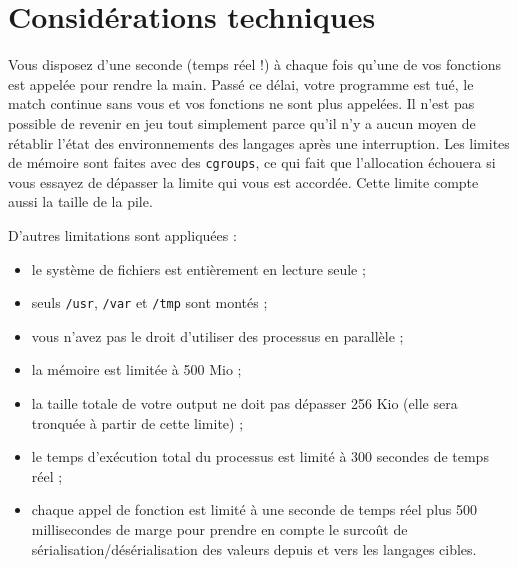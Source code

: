 \section{Considérations techniques}

Vous disposez d'une seconde (temps réel !) à chaque fois qu'une de vos
fonctions est appelée pour rendre la main. Passé ce délai, votre programme est
tué, le match continue sans vous et vos fonctions ne sont plus appelées. Il
n'est pas possible de revenir en jeu tout simplement parce qu'il n'y a aucun
moyen de rétablir l'état des environnements des langages après une
interruption.  Les limites de mémoire sont faites avec des \texttt{cgroups}, ce
qui fait que l'allocation échouera si vous essayez de dépasser la limite qui
vous est accordée. Cette limite compte aussi la taille de la pile.

D'autres limitations sont appliquées :

\begin{itemize}
    \item le système de fichiers est entièrement en lecture seule ;
    \item seuls \texttt{/usr}, \texttt{/var} et \texttt{/tmp} sont montés ;
    \item vous n'avez pas le droit d'utiliser des processus en parallèle ;
    \item la mémoire est limitée à 500 Mio ;
    \item la taille totale de votre output ne doit pas dépasser 256 Kio (elle
        sera tronquée à partir de cette limite) ;
    \item le temps d'exécution total du processus est limité à 300 secondes de
        temps réel ;
    \item chaque appel de fonction est limité à une seconde de temps réel plus
        500 millisecondes de marge pour prendre en compte le surcoût de
        sérialisation/désérialisation des valeurs depuis et vers les langages
        cibles.
\end{itemize}

